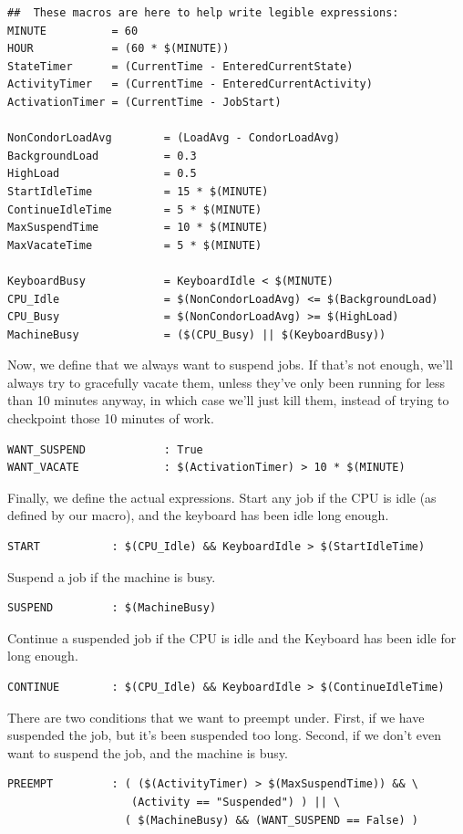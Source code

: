 \begin{verbatim}
##  These macros are here to help write legible expressions:
MINUTE          = 60
HOUR            = (60 * $(MINUTE))
StateTimer      = (CurrentTime - EnteredCurrentState)
ActivityTimer   = (CurrentTime - EnteredCurrentActivity)
ActivationTimer = (CurrentTime - JobStart)

NonCondorLoadAvg        = (LoadAvg - CondorLoadAvg)
BackgroundLoad          = 0.3
HighLoad                = 0.5
StartIdleTime           = 15 * $(MINUTE)
ContinueIdleTime        = 5 * $(MINUTE)
MaxSuspendTime          = 10 * $(MINUTE)
MaxVacateTime           = 5 * $(MINUTE)

KeyboardBusy            = KeyboardIdle < $(MINUTE)
CPU_Idle                = $(NonCondorLoadAvg) <= $(BackgroundLoad)
CPU_Busy                = $(NonCondorLoadAvg) >= $(HighLoad)
MachineBusy             = ($(CPU_Busy) || $(KeyboardBusy))
\end{verbatim}

Now, we define that we always want to suspend jobs.
If that's not enough, we'll always try to gracefully vacate them,
unless they've only been running for less than 10 minutes anyway, in
which case we'll just kill them, instead of trying to checkpoint those
10 minutes of work.
\begin{verbatim}
WANT_SUSPEND            : True
WANT_VACATE             : $(ActivationTimer) > 10 * $(MINUTE)
\end{verbatim}

Finally, we define the actual expressions.  Start any job if the CPU
is idle (as defined by our macro), and the keyboard has been idle long
enough.
\begin{verbatim}
START           : $(CPU_Idle) && KeyboardIdle > $(StartIdleTime)
\end{verbatim}

Suspend a job if the machine is busy.
\begin{verbatim}
SUSPEND         : $(MachineBusy)
\end{verbatim}

Continue a suspended job if the CPU is idle and the Keyboard has been
idle for long enough.
\begin{verbatim}
CONTINUE        : $(CPU_Idle) && KeyboardIdle > $(ContinueIdleTime)
\end{verbatim}

There are two conditions that we want to preempt under.
First, if we have suspended the job, but it's been suspended too long.
Second, if we don't even want to suspend the job, and the machine is
busy. 
\begin{verbatim}
PREEMPT	        : ( ($(ActivityTimer) > $(MaxSuspendTime)) && \
                   (Activity == "Suspended") ) || \
                  ( $(MachineBusy) && (WANT_SUSPEND == False) )
\end{verbatim}

